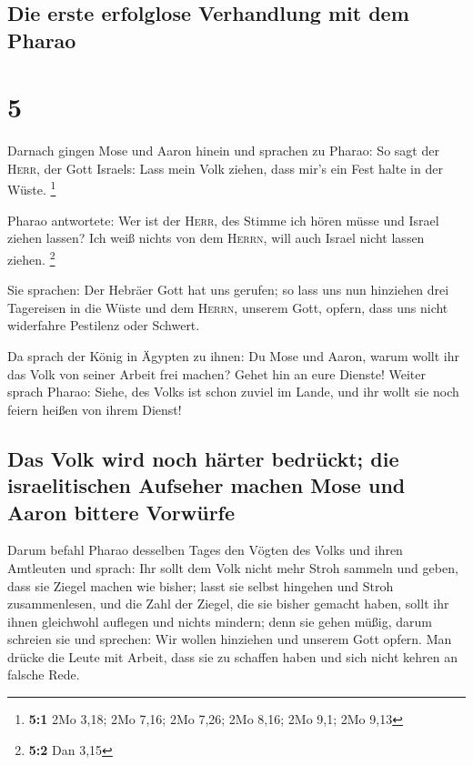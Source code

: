\hypertarget{die-erste-erfolglose-verhandlung-mit-dem-pharao}{%
\subsection{Die erste erfolglose Verhandlung mit dem
Pharao}\label{die-erste-erfolglose-verhandlung-mit-dem-pharao}}

\hypertarget{section-4}{%
\section{5}\label{section-4}}

 Darnach gingen Mose und Aaron hinein und sprachen zu
Pharao: So sagt der \textsc{Herr}, der Gott Israels: Lass mein Volk
ziehen, dass mir's ein Fest halte in der Wüste. \footnote{\textbf{5:1}
  2Mo 3,18; 2Mo 7,16; 2Mo 7,26; 2Mo 8,16; 2Mo 9,1; 2Mo 9,13}

 Pharao antwortete: Wer ist der \textsc{Herr}, des Stimme
ich hören müsse und Israel ziehen lassen? Ich weiß nichts von dem
\textsc{Herrn}, will auch Israel nicht lassen ziehen. \footnote{\textbf{5:2}
  Dan 3,15}

 Sie sprachen: Der Hebräer Gott hat uns gerufen; so lass
uns nun hinziehen drei Tagereisen in die Wüste und dem \textsc{Herrn},
unserem Gott, opfern, dass uns nicht widerfahre Pestilenz oder Schwert.

 Da sprach der König in Ägypten zu ihnen: Du Mose und
Aaron, warum wollt ihr das Volk von seiner Arbeit frei machen? Gehet hin
an eure Dienste!  Weiter sprach Pharao: Siehe, des Volks
ist schon zuviel im Lande, und ihr wollt sie noch feiern heißen von
ihrem Dienst!

\hypertarget{das-volk-wird-noch-huxe4rter-bedruxfcckt-die-israelitischen-aufseher-machen-mose-und-aaron-bittere-vorwuxfcrfe}{%
\subsection{Das Volk wird noch härter bedrückt; die israelitischen
Aufseher machen Mose und Aaron bittere
Vorwürfe}\label{das-volk-wird-noch-huxe4rter-bedruxfcckt-die-israelitischen-aufseher-machen-mose-und-aaron-bittere-vorwuxfcrfe}}

 Darum befahl Pharao desselben Tages den Vögten des Volks
und ihren Amtleuten und sprach:  Ihr sollt dem Volk nicht
mehr Stroh sammeln und geben, dass sie Ziegel machen wie bisher; lasst
sie selbst hingehen und Stroh zusammenlesen,  und die Zahl
der Ziegel, die sie bisher gemacht haben, sollt ihr ihnen gleichwohl
auflegen und nichts mindern; denn sie gehen müßig, darum schreien sie
und sprechen: Wir wollen hinziehen und unserem Gott opfern.
 Man drücke die Leute mit Arbeit, dass sie zu schaffen
haben und sich nicht kehren an falsche Rede.

